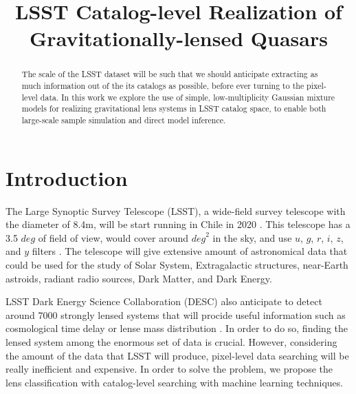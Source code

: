 \documentclass[\docopts]{\docclass}
\begin{document}
\title{ LSST Catalog-level Realization of Gravitationally-lensed Quasars }

\maketitlepre

\begin{abstract}

The scale of the LSST dataset will be such that we should anticipate
extracting as much information out of the its catalogs as possible,
before ever turning to the pixel-level data. In this work we explore the
use of simple, low-multiplicity Gaussian mixture models for realizing
gravitational lens systems in LSST catalog space, to enable both
large-scale sample simulation and direct model inference.

\end{abstract}


\maketitlepost


\section{Introduction}
\label{sec:intro}

The Large Synoptic Survey Telescope (LSST), a wide-field survey telescope with the diameter of 8.4m, will be start running in Chile in 2020 \citep{LSST_overall}. This telescope has a 3.5 $deg$ of field of view, would cover around $\textit{deg}^2$ in the sky, and use $u$, $g$, $r$, $i$, $z$, and $y$ filters \cite{LSST_Science_Book_v2.0}. The telescope will give extensive amount of astronomical data that could be used for the study of Solar System, Extragalactic structures, near-Earth astroids, radiant radio sources, Dark Matter, and Dark Energy. 

LSST Dark Energy Science Collaboration (DESC) also anticipate to detect around 7000 strongly lensed systems that will procide useful information such as cosmological time delay or lense mass distribution \cite{DESC_overall} \citep{time_delay_overall} \cite{Twinkles}. In order to do so, finding the lensed system among the enormous set of data is crucial. However, considering the amount of the data that LSST will produce, pixel-level data searching will be really inefficient and expensive. In order to solve the problem, we propose the lens classification with catalog-level searching with machine learning techniques.
\end{document}
